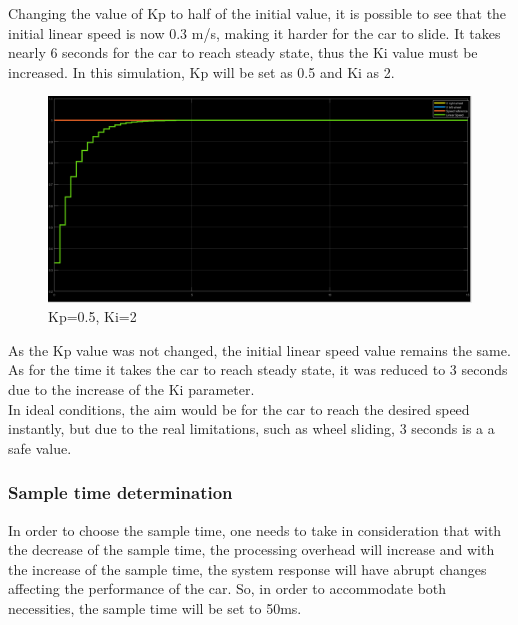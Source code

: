 Changing the value of Kp to half of the initial value, it is possible to see that the initial linear speed is now 0.3 m/s, making it harder for the car to slide. It takes nearly 6 seconds for the car to reach steady state, thus the Ki value must be increased.
\newpage
In this simulation, Kp will be set as 0.5 and Ki as 2.
\begin{figure}[!h]
\centering
\includegraphics[width=1.0\textwidth]{./img/pid052.png}
\caption {\label{fig:pid1 - p05i2}Kp=0.5, Ki=2}
\end{figure}
As the Kp value was not changed, the initial linear speed value remains the same. As for the time it takes the car to reach steady state, it was reduced to 3 seconds due to the increase of the Ki parameter.\\
In ideal conditions, the aim would be for the car to reach the desired speed instantly, but due to the real limitations, such as wheel sliding, 3 seconds is a a safe value.
\newline
\subsubsection{Sample time determination}
In order to choose the sample time, one needs to take in consideration that with the decrease of the sample time, the processing overhead will increase and with the increase of the sample time, the system response will have abrupt changes affecting the performance of the car. So, in order to accommodate both necessities, the sample time will be set to 50ms.
\newpage
